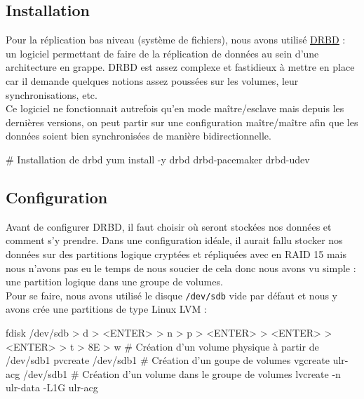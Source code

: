 \documentclass[11pt,a4paper]{report}
\begin{document}
            \subsection{Installation}
                
                Pour la réplication bas niveau (système de fichiers), nous avons utilisé \underline{\href{http://www.drbd.org/}{DRBD}} : un logiciel permettant de faire de la réplication de données au sein d'une architecture en grappe. DRBD est assez complexe et fastidieux à mettre en place car il demande quelques notions assez poussées sur les volumes, leur synchronisations, etc.\\
                
                Ce logiciel ne fonctionnait autrefois qu'en mode maître/esclave mais depuis les dernières versions, on peut partir sur une configuration maître/maître afin que les données soient bien synchronisées de manière bidirectionnelle.\\
                
                \begin{bashcode}
                    # Installation de drbd
                    yum install -y drbd drbd-pacemaker drbd-udev
                \end{bashcode}
                
            \subsection{Configuration}
                
                Avant de configurer DRBD, il faut choisir où seront stockées nos données et comment s'y prendre. Dans une configuration idéale, il aurait fallu stocker nos données sur des partitions logique cryptées et répliquées avec en RAID 15 mais nous n'avons pas eu le temps de nous soucier de cela donc nous avons vu simple : une partition logique dans une groupe de volumes.\\
                
                Pour se faire, nous avons utilisé le disque \verb+/dev/sdb+ vide par défaut et nous y avons crée une partitions de type Linux LVM :\\
                
                \begin{bashcode}
                    fdisk /dev/sdb
                    > d
                    > <ENTER>
                    > n
                    > p
                    > <ENTER>
                    > <ENTER>
                    > <ENTER>
                    > t
                    > 8E
                    > w
                    # Création d'un volume physique à partir de /dev/sdb1
                    pvcreate /dev/sdb1
                    # Création d'un goupe de volumes
                    vgcreate ulr-acg /dev/sdb1
                    # Création d'un volume dans le groupe de volumes
                    lvcreate -n ulr-data -L1G ulr-acg
                \end{bashcode}
                
\end{document}
